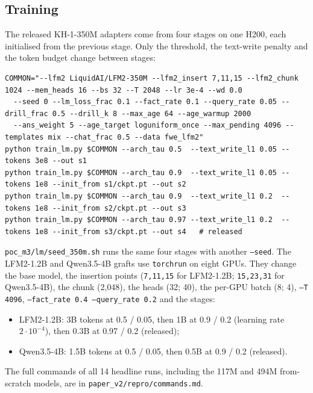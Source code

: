 \subsection{Training}
The released KH-1-350M adapters come from four stages on one H200, each initialised from the previous stage. Only the threshold, the text-write penalty and the token budget change between stages:
\begin{lstlisting}
COMMON="--lfm2 LiquidAI/LFM2-350M --lfm2_insert 7,11,15 --lfm2_chunk 1024 --mem_heads 16 --bs 32 --T 2048 --lr 3e-4 --wd 0.0
  --seed 0 --lm_loss_frac 0.1 --fact_rate 0.1 --query_rate 0.05 --drill_frac 0.5 --drill_k 8 --max_age 64 --age_warmup 2000
  --ans_weight 5 --age_target loguniform_once --max_pending 4096 --templates mix --chat_frac 0.5 --data fwe_lfm2"
python train_lm.py $COMMON --arch_tau 0.5  --text_write_l1 0.05 --tokens 3e8 --out s1
python train_lm.py $COMMON --arch_tau 0.9  --text_write_l1 0.05 --tokens 1e8 --init_from s1/ckpt.pt --out s2
python train_lm.py $COMMON --arch_tau 0.9  --text_write_l1 0.2  --tokens 1e8 --init_from s2/ckpt.pt --out s3
python train_lm.py $COMMON --arch_tau 0.97 --text_write_l1 0.2  --tokens 1e8 --init_from s3/ckpt.pt --out s4   # released
\end{lstlisting}
\texttt{poc\_m3/lm/seed\_350m.sh} runs the same four stages with another \texttt{--seed}. The LFM2-1.2B and Qwen3.5-4B grafts use \texttt{torchrun} on eight GPUs. They change the base model, the insertion points (\texttt{7,11,15} for LFM2-1.2B; \texttt{15,23,31} for Qwen3.5-4B), the chunk (2{,}048), the heads (32; 40), the per-GPU batch (8; 4), \texttt{--T 4096}, \texttt{--fact\_rate 0.4 --query\_rate 0.2} and the stages:
\begin{itemize}
\item LFM2-1.2B: 3B tokens at 0.5 / 0.05, then 1B at 0.9 / 0.2 (learning rate $2\cdot10^{-4}$), then 0.3B at 0.97 / 0.2 (released);
\item Qwen3.5-4B: 1.5B tokens at 0.5 / 0.05, then 0.5B at 0.9 / 0.2 (released).
\end{itemize}
The full commands of all 14 headline runs, including the 117M and 494M from-scratch models, are in \texttt{paper\_v2/repro/commands.md}.

